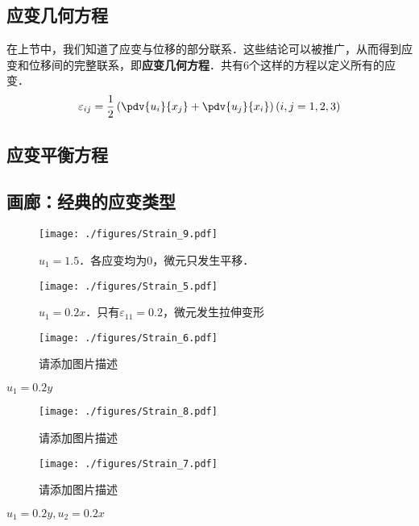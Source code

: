 \subsection{应变几何方程}
在上节中，我们知道了应变与位移的部分联系．这些结论可以被推广，从而得到应变和位移间的完整联系，即\textbf{应变几何方程}．共有6个这样的方程以定义所有的应变．
\begin{equation}
\varepsilon_{ij} = \frac{1}{2}\left(\pdv{u_i}{x_j}+\pdv{u_j}{x_i}\right) (i,j=1,2,3)
\end{equation}

\subsection{应变平衡方程}

\subsection{画廊：经典的应变类型}

\begin{figure}[ht]
\centering
\texttt{[image: ./figures/Strain\_9.pdf]}
\caption{$u_1=1.5$．各应变均为$0$，微元只发生平移．} \label{Strain_fig9}
\end{figure}

\begin{figure}[ht]
\centering
\texttt{[image: ./figures/Strain\_5.pdf]}
\caption{$u_1=0.2x$．只有$\varepsilon_{11}=0.2$，微元发生拉伸变形} \label{Strain_fig5}
\end{figure}

\begin{figure}[ht]
\centering
\texttt{[image: ./figures/Strain\_6.pdf]}
\caption{请添加图片描述} \label{Strain_fig6}
\end{figure}
$u_1=0.2y$

\begin{figure}[ht]
\centering
\texttt{[image: ./figures/Strain\_8.pdf]}
\caption{请添加图片描述} \label{Strain_fig8}
\end{figure}
\begin{figure}[ht]
\centering
\texttt{[image: ./figures/Strain\_7.pdf]}
\caption{请添加图片描述} \label{Strain_fig7}
\end{figure}
$u_1=0.2y, u_2=0.2x$
